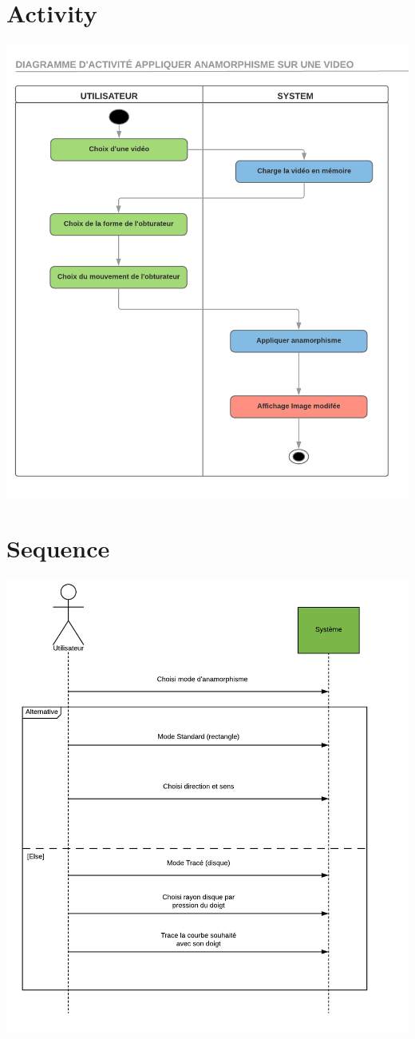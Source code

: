 \documentclass[a4paper,12pt]{report}
\begin{document}
\section{Activity}
\begin{center}
 \includegraphics[scale=0.7]{./Activites.png}
\end{center}

\section{Sequence}
\begin{center}
 \includegraphics[scale=0.7]{./Sequence.png}
\end{center}
\end{document}

